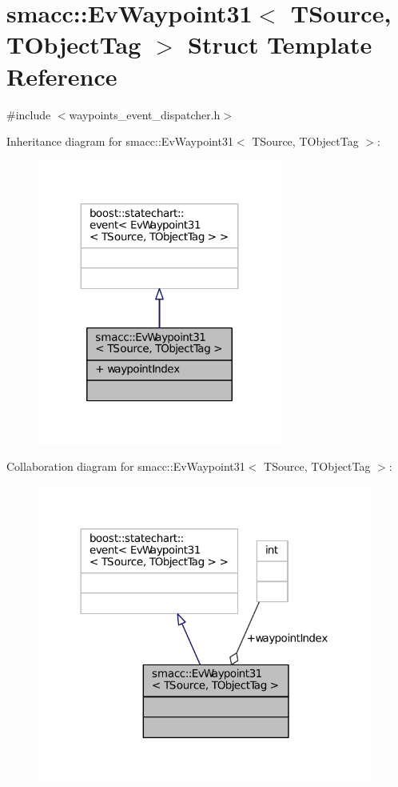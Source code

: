 \hypertarget{structsmacc_1_1EvWaypoint31}{}\section{smacc\+:\+:Ev\+Waypoint31$<$ T\+Source, T\+Object\+Tag $>$ Struct Template Reference}
\label{structsmacc_1_1EvWaypoint31}


{\ttfamily \#include $<$waypoints\+\_\+event\+\_\+dispatcher.\+h$>$}



Inheritance diagram for smacc\+:\+:Ev\+Waypoint31$<$ T\+Source, T\+Object\+Tag $>$\+:
\nopagebreak
\begin{figure}[H]
\begin{center}
\leavevmode
\includegraphics[width=227pt]{structsmacc_1_1EvWaypoint31__inherit__graph}
\end{center}
\end{figure}


Collaboration diagram for smacc\+:\+:Ev\+Waypoint31$<$ T\+Source, T\+Object\+Tag $>$\+:
\nopagebreak
\begin{figure}[H]
\begin{center}
\leavevmode
\includegraphics[width=312pt]{structsmacc_1_1EvWaypoint31__coll__graph}
\end{center}
\end{figure}
